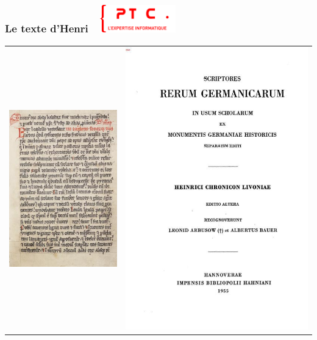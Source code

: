 \documentclass[11pt]{beamer}
\newenvironment{slide}[1]{%
\begin{frame}[environment=slide]
\frametitle{#1~\hfill~\includegraphics[height=1.2cm]{./epitech.png}}
}{%
\end{frame}
}
\begin{document}
\begin{slide}{Le texte d'Henri}
\begin{center}
\begin{tabular}{cc}
\includegraphics[scale=0.4]{HL.jpg} &
\includegraphics[scale=0.3]{MGH.jpeg}
\end{tabular}
\end{center}
\end{slide}
\end{document}

